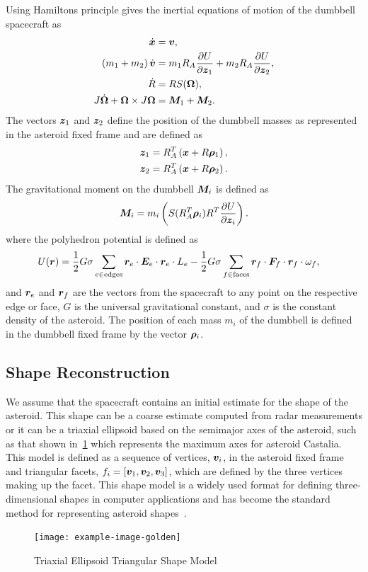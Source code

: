 \documentclass[letterpaper, paper,11pt]{AAS}		%
\begin{document}
Using Hamiltons principle gives the inertial equations of motion of the dumbbell spacecraft as
\begin{align}
    \dot{\bm{x}} &= \bm{v}, \\
    \left( m_1 + m_2 \right) \dot{\bm{v}} &= m_1 R_A \frac{\partial U}{\partial \bm{z}_1} + m_2 R_A \frac{\partial U}{\partial \bm{z}_2}, \\
    \dot{R} &= R S(\bm{\Omega}) , \\
    J \dot{\bm{\Omega}} + \bm{\Omega} \times J \bm{\Omega} &= \bm{M}_1 + \bm{M}_2.
\end{align}
The vectors \( \bm{z}_1 \) and \( \bm{z}_2\) define the position of the dumbbell masses as represented in the asteroid fixed frame and are defined as
\begin{align}
    \bm{z}_1 &= R_A^T \left( \bm{x} + R \bm{\rho}_1 \right) , \\
    \bm{z}_2 &= R_A^T \left( \bm{x} + R \bm{\rho}_2 \right).
\end{align}
The gravitational moment on the dumbbell \( \bm{M}_i\) is defined as
\begin{align}
    \bm{M}_i = m_i \left( S(R_A^T \bm{\rho}_i) R^T \frac{\partial U}{\partial \bm{z}_i} \right).
\end{align}
where the polyhedron potential is defined as 
\begin{align}
    U(\bm{r}) &= \frac{1}{2} G \sigma \sum_{e \in \text{edges}} \bm{r}_e \cdot \bm{E}_e \cdot \bm{r}_e \cdot L_e - \frac{1}{2}G \sigma \sum_{f \in \text{faces}} \bm{r}_f \cdot \bm{F}_f \cdot \bm{r}_f \cdot \omega_f,
\end{align}
and \( \bm{r}_e\) and \(\bm{r}_f \) are the vectors from the spacecraft to any point on the respective edge or face, \( G\) is the universal gravitational constant, and \( \sigma \) is the constant density of the asteroid.
The position of each mass \(m_i\) of the dumbbell is defined in the dumbbell fixed frame by the vector \(\bm{\rho}_i\). 

\subsection{Shape Reconstruction}

We assume that the spacecraft contains an initial estimate for the shape of the asteroid.
This shape can be a coarse estimate computed from radar measurements or it can be a triaxial ellipsoid based on the semimajor axes of the asteroid, such as that shown in~\cref{fig:initial_ellipsoid} which represents the maximum axes for asteroid Castalia.
This model is defined as a sequence of vertices, \( \bm{v}_i\), in the asteroid fixed frame and triangular facets, \( f_i = \left[ \bm{v}_1, \bm{v}_2, \bm{v}_3 \right]\), which are defined by the three vertices making up the facet.
This shape model is a widely used format for defining three-dimensional shapes in computer applications and has become the standard method for representing asteroid shapes~\cite{neese2004}.
\begin{figure}
    \centering
    \texttt{[image: example-image-golden]}
    \caption{Triaxial Ellipsoid Triangular Shape Model~\label{fig:initial_ellipsoid}}
\end{figure}
\end{document}
